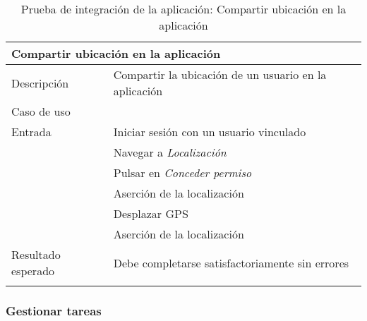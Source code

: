\begin{longtable}{|p{} p{}|}
    \hline
    \multicolumn{2}{|l|}{\textbf{Compartir ubicación en la aplicación}} \\ \hline 
    Descripción                 & Compartir la ubicación de un usuario en la aplicación \\ \hline
    Caso de uso                 & \nameref{cu:compartir_ubicacion} \\ \hline
    Entrada                     & Iniciar sesión con un usuario vinculado \\
                                & Navegar a \emph{Localización} \\ 
                                & Pulsar en \emph{Conceder permiso} \\
                                & Aserción de la localización \\
                                & Desplazar GPS \\
                                & Aserción de la localización \\ \hline
    Resultado esperado          & Debe completarse satisfactoriamente sin errores \\ \hline
    \caption{Prueba de integración de la aplicación: Compartir ubicación en la aplicación}
    \label{cp:i:app:compartir_ubicacion}
\end{longtable}

\newpage
\subsubsection{Gestionar tareas}


